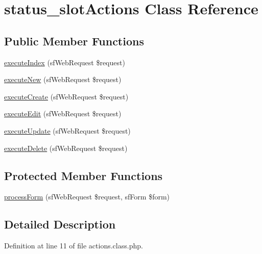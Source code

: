 \hypertarget{classstatus__slot_actions}{\section{status\-\_\-slot\-Actions Class Reference}
\label{classstatus__slot_actions}
}
\subsection*{Public Member Functions}
\begin{DoxyCompactItemize}
\item 
\hyperlink{classstatus__slot_actions_a948cc911eb1d9f77990be54af3b2080f}{execute\-Index} (sf\-Web\-Request \$request)
\item 
\hyperlink{classstatus__slot_actions_a0ffbea56560c6c633dae68ec22aff21c}{execute\-New} (sf\-Web\-Request \$request)
\item 
\hyperlink{classstatus__slot_actions_a75837617743fb64dca82d8133b2c662a}{execute\-Create} (sf\-Web\-Request \$request)
\item 
\hyperlink{classstatus__slot_actions_af4d8fedd4b28f3398826a1bb8fa54394}{execute\-Edit} (sf\-Web\-Request \$request)
\item 
\hyperlink{classstatus__slot_actions_af7b4f51862add3c2ebb54efc136a0840}{execute\-Update} (sf\-Web\-Request \$request)
\item 
\hyperlink{classstatus__slot_actions_a52b5b11b11a0070dd2662257520c045a}{execute\-Delete} (sf\-Web\-Request \$request)
\end{DoxyCompactItemize}
\subsection*{Protected Member Functions}
\begin{DoxyCompactItemize}
\item 
\hyperlink{classstatus__slot_actions_a7cf661d837626e0320753cbffa019a01}{process\-Form} (sf\-Web\-Request \$request, sf\-Form \$form)
\end{DoxyCompactItemize}


\subsection{Detailed Description}


Definition at line 11 of file actions.\-class.\-php.



